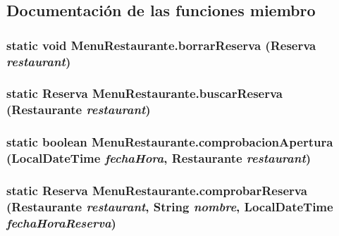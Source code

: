 \subsection{Documentación de las funciones miembro}
\subsubsection[{borrarReserva}]{\setlength{\rightskip}{0pt plus 5cm}static void MenuRestaurante.borrarReserva ({\bf Reserva} {\em restaurant})\hspace{0.3cm}{\tt  [static]}}\label{class_menu_restaurante_c2b91c1cbcdd25d63a33f285bd39a980}


\subsubsection[{buscarReserva}]{\setlength{\rightskip}{0pt plus 5cm}static {\bf Reserva} MenuRestaurante.buscarReserva ({\bf Restaurante} {\em restaurant})\hspace{0.3cm}{\tt  [static]}}\label{class_menu_restaurante_4e9ba7f79c9040afdc760a919e191eb8}


\subsubsection[{comprobacionApertura}]{\setlength{\rightskip}{0pt plus 5cm}static boolean MenuRestaurante.comprobacionApertura (LocalDateTime {\em fechaHora}, \/  {\bf Restaurante} {\em restaurant})\hspace{0.3cm}{\tt  [static]}}\label{class_menu_restaurante_680d886677dc5c6d5a6091a9cfc7f0b7}


\subsubsection[{comprobarReserva}]{\setlength{\rightskip}{0pt plus 5cm}static {\bf Reserva} MenuRestaurante.comprobarReserva ({\bf Restaurante} {\em restaurant}, \/  String {\em nombre}, \/  LocalDateTime {\em fechaHoraReserva})\hspace{0.3cm}{\tt  [static]}}\label{class_menu_restaurante_932109c8b2c7e37dedacc504feeea538}


